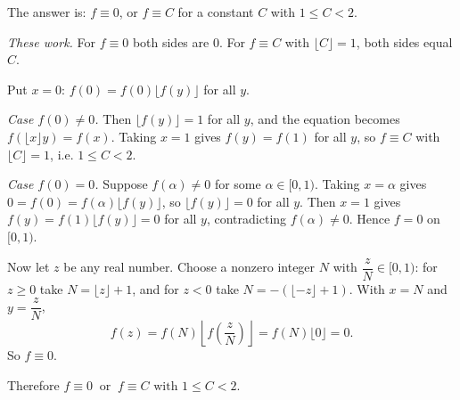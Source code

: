 The answer is: $f\equiv0$, or $f\equiv C$ for a constant $C$ with $1\le C<2$.

\emph{These work.} For $f\equiv0$ both sides are $0$. For $f\equiv C$ with $\lfloor C\rfloor=1$, both sides equal $C$.

Put $x=0$: $f(0)=f(0)\lfloor f(y)\rfloor$ for all $y$.

\emph{Case $f(0)\ne0$.} Then $\lfloor f(y)\rfloor=1$ for all $y$, and the equation becomes $f\left(\lfloor x\rfloor y\right)=f(x)$. Taking $x=1$ gives $f(y)=f(1)$ for all $y$, so $f\equiv C$ with $\lfloor C\rfloor=1$, i.e. $1\le C<2$.

\emph{Case $f(0)=0$.} Suppose $f(\alpha)\ne0$ for some $\alpha\in[0,1)$. Taking $x=\alpha$ gives $0=f(0)=f(\alpha)\lfloor f(y)\rfloor$, so $\lfloor f(y)\rfloor=0$ for all $y$. Then $x=1$ gives $f(y)=f(1)\lfloor f(y)\rfloor=0$ for all $y$, contradicting $f(\alpha)\ne0$. Hence $f=0$ on $[0,1)$.

Now let $z$ be any real number. Choose a nonzero integer $N$ with $\dfrac zN\in[0,1)$: for $z\ge0$ take $N=\lfloor z\rfloor+1$, and for $z<0$ take $N=-\left(\lfloor -z\rfloor+1\right)$. With $x=N$ and $y=\dfrac zN$,
\[f(z)=f(N)\left\lfloor f\left(\dfrac zN\right)\right\rfloor=f(N)\lfloor0\rfloor=0.\]
So $f\equiv0$.

Therefore $\boxed{f\equiv0\ \text{ or }\ f\equiv C\text{ with }1\le C<2}$.
